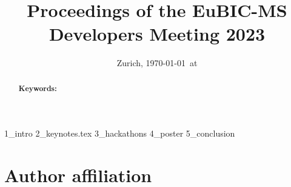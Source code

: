 \documentclass[11pt,a4paper,DIV21,abstracton,draft,twocolumn]{scrartcl}
\title{Proceedings of the EuBIC-MS Developers Meeting 2023}
\author{
	
}
\date{{\small Zurich, \today\ at \currenttime}}
\begin{document}
\maketitle
\begin{abstract}
	
	\vspace{0.5cm}
	\textbf{Keywords:
	}
	
\end{abstract}


 {1_intro}
 {2_keynotes.tex}
 {3_hackathons}
 {4_poster}
 {5_conclusion}




\newpage
\appendix
\section{Author affiliation}
\begin{table*}[ht]
\centering
\label{tab:affiliation}

\caption{Author affiliation; grouped by author and ordered by affiliation.}
\end{table*}
\end{document}
